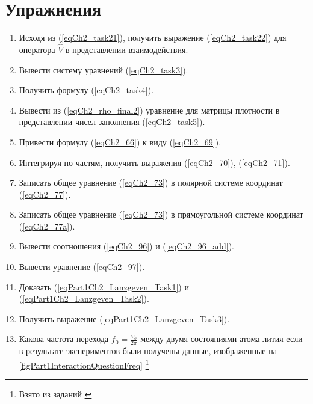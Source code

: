 \section{Упражнения}
\begin{enumerate}
\item Исходя из (\ref{eqCh2_task21}), получить выражение
  (\ref{eqCh2_task22}) для оператора $\hat{V}$ в представлении
  взаимодействия. 
\item Вывести систему уравнений (\ref{eqCh2_task3}).
\item Получить формулу (\ref{eqCh2_task4}).
\item Вывести из (\ref{eqCh2_rho_final2}) уравнение для матрицы
  плотности в представлении чисел заполнения (\ref{eqCh2_task5}). 
\item Привести формулу (\ref{eqCh2_66}) к виду (\ref{eqCh2_69}).
\item Интегрируя по частям, получить выражения (\ref{eqCh2_70}),
  (\ref{eqCh2_71}).
\item Записать общее уравнение (\ref{eqCh2_73}) в полярной системе
  координат (\ref{eqCh2_77}). 
\item Записать общее уравнение (\ref{eqCh2_73}) в прямоугольной
  системе координат (\ref{eqCh2_77a}). 
\item Вывести соотношения (\ref{eqCh2_96}) и (\ref{eqCh2_96_add}).
\item Вывести уравнение (\ref{eqCh2_97}).
\item Доказать (\ref{eqPart1Ch2_Lanzgeven_Task1}) и (\ref{eqPart1Ch2_Lanzgeven_Task2}).
\item Получить выражение (\ref{eqPart1Ch2_Lanzgeven_Task3}).
\item \label{qInteractionFreq} Какова частота перехода $f_0 = \frac{\omega_o}{2 \pi}$ между двумя
  состояниями атома лития если в результате экспериментов были
  получены данные, изображенные на
  \autoref{figPart1InteractionQuestionFreq} \footnote{Взято из
    заданий \cite{courseIntroQuantumOpticsCoursera}} 
\end{enumerate}

 
